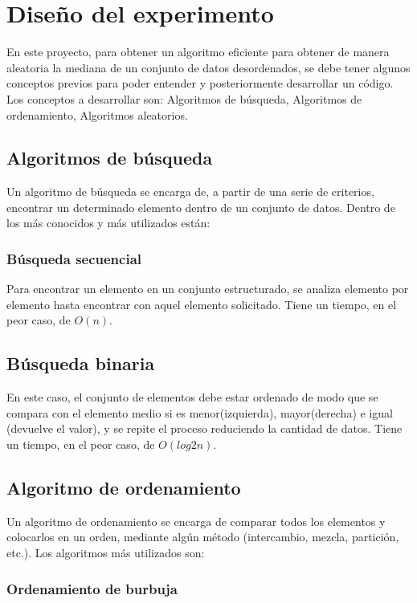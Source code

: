 \documentclass[final,a4paper,romanappendices]{IEEEtran}\usepackage[]{graphicx}\usepackage[]{color}
\theoremstyle{definition}
\begin{document}
\section{Diseño del experimento}
En este proyecto, para obtener un algoritmo eficiente para obtener de manera aleatoria la mediana de un conjunto de datos desordenados, se debe tener algunos conceptos previos para poder entender y posteriormente desarrollar un código. Los conceptos a desarrollar son: Algoritmos de búsqueda, Algoritmos de ordenamiento, Algoritmos aleatorios.

\subsection{Algoritmos de búsqueda}
Un algoritmo de búsqueda se encarga de, a partir de una serie de criterios, encontrar un determinado elemento dentro de un conjunto de datos. Dentro de los más conocidos y más utilizados están:
\subsubsection{Búsqueda secuencial}
Para encontrar un elemento en un conjunto estructurado, se analiza elemento por elemento hasta encontrar con aquel elemento solicitado. Tiene un tiempo, en el peor caso, de $O(n)$.
\subsection{Búsqueda binaria}
En este caso, el conjunto de elementos debe estar ordenado de modo que se compara con el elemento medio si es menor(izquierda), mayor(derecha) e igual (devuelve el valor), y se repite el proceso reduciendo la cantidad de datos. Tiene un tiempo, en el peor caso, de $O(log2n)$.

\subsection{Algoritmo de ordenamiento}

Un algoritmo de ordenamiento se encarga de comparar todos los elementos y colocarlos en un orden, mediante algún método (intercambio, mezcla, partición, etc.). Los algoritmos más utilizados son: %

\subsubsection{Ordenamiento de burbuja}
\end{document}
